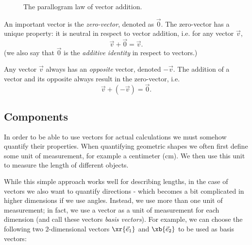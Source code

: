 \begin{figure}[h]
	\centering
	\caption{The parallogram law of vector addition.}
	\label{fig:parallelogram}
\end{figure}

An important vector is the \emph{zero-vector}, denoted as $\vec{0}$. The zero-vector has a unique property: it is neutral in respect to vector addition, i.e. for any vector $\vec{v}$,
\begin{equation}
	\vec{v} + \vec{0} = \vec{v}.
	\label{eq:zero-vector}
\end{equation}
(we also say that $\vec{0}$ is the \emph{additive identity} in respect to vectors.)

Any vector $\vec{v}$ always has an \emph{opposite} vector, denoted $-\vec{v}$. The addition of a vector and its opposite always result in the zero-vector, i.e.
\begin{equation}
	\vec{v} + \left( -\vec{v} \right) = \vec{0}.
	\label{eq:opposite vector}
\end{equation}

\subsection{Components}
In order to be able to use vectors for actual calculations we must somehow quantify their properties. When quantifying geometric shapes we often first define some unit of measurement, for example a centimeter (\si{cm}). We then use this unit to measure the length of different objects.

While this simple approach works well for describing lengths, in the case of vectors we also want to quantify directions - which becomes a bit complicated in higher dimensions if we use angles. Instead, we use more than one unit of measurement; in fact, we use a vector as a unit of measurement for each dimension (and call these vectors \emph{basis vectors}). For example, we can choose the following two $2$-dimensional vectors $\xr{\vec{e}_{1}}$ and $\xb{\vec{e}_{2}}$ to be used as basis vectors:

\begin{center}
\end{center}

